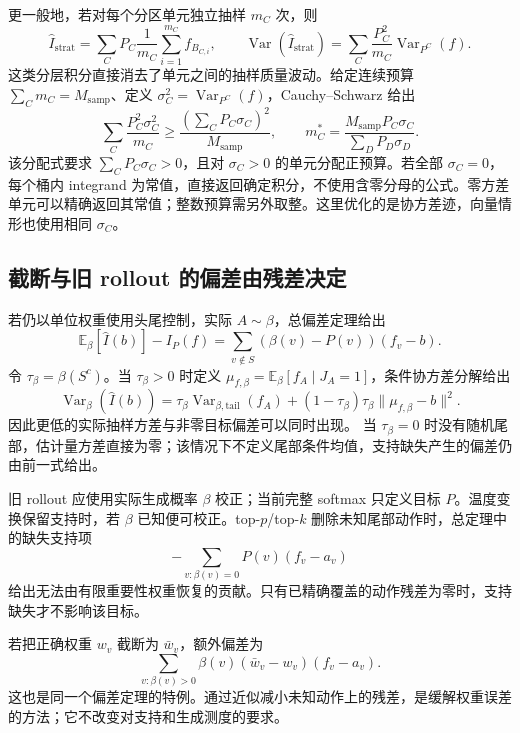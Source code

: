 \documentclass[lang=cn,scheme=chinese,openany]{../book/elegantbook}
\newcommand{\E}{\mathbb E}
\newcommand{\Var}{\operatorname{Var}}
\newcommand{\tail}{\mathrm{tail}}
\begin{document}
更一般地，若对每个分区单元独立抽样 $m_C$ 次，则
\begin{equation*}
 \widehat I_{\mathrm{strat}}
 =\sum_CP_C\frac1{m_C}\sum_{i=1}^{m_C}f_{B_{C,i}},\qquad
 \Var(\widehat I_{\mathrm{strat}})
 =\sum_C\frac{P_C^2}{m_C}\Var_{P^C}(f).
\end{equation*}
这类分层积分直接消去了单元之间的抽样质量波动。给定连续预算 $\sum_Cm_C=M_{\mathrm{samp}}$、定义 $\sigma_C^2=\Var_{P^C}(f)$，Cauchy--Schwarz 给出
\begin{equation*}
 \sum_C\frac{P_C^2\sigma_C^2}{m_C}
 \ge\frac{(\sum_CP_C\sigma_C)^2}{M_{\mathrm{samp}}},
 \qquad m_C^*=\frac{M_{\mathrm{samp}}P_C\sigma_C}{\sum_DP_D\sigma_D}.
\end{equation*}
该分配式要求 $\sum_CP_C\sigma_C>0$，且对 $\sigma_C>0$ 的单元分配正预算。若全部 $\sigma_C=0$，每个桶内 integrand 为常值，直接返回确定积分，不使用含零分母的公式。零方差单元可以精确返回其常值；整数预算需另外取整。这里优化的是协方差迹，向量情形也使用相同 $\sigma_C$。

\subsection{截断与旧 rollout 的偏差由残差决定}
若仍以单位权重使用头尾控制，实际 $A\sim\beta$，总偏差定理给出
\begin{equation}\label{est:eq:kl-wrong-measure-bias}
 \E_\beta[\widehat I(b)]-I_P(f)
 =\sum_{v\notin S}(\beta(v)-P(v))(f_v-b).
\end{equation}
令 $\tau_\beta=\beta(S^c)$。当 $\tau_\beta>0$ 时定义 $\mu_{f,\beta}=\E_\beta[f_A\mid J_A=1]$，条件协方差分解给出
\begin{equation}\label{est:eq:kl-wrong-measure-var}
 \Var_\beta(\widehat I(b))
 =\tau_\beta\Var_{\beta,\tail}(f_A)
 +(1-\tau_\beta)\tau_\beta\|\mu_{f,\beta}-b\|^2.
\end{equation}
因此更低的实际抽样方差与非零目标偏差可以同时出现。
当 $\tau_\beta=0$ 时没有随机尾部，估计量方差直接为零；该情况下不定义尾部条件均值，支持缺失产生的偏差仍由前一式给出。

旧 rollout 应使用实际生成概率 $\beta$ 校正；当前完整 softmax 只定义目标 $P$。温度变换保留支持时，若 $\beta$ 已知便可校正。top-$p$/top-$k$ 删除未知尾部动作时，总定理中的缺失支持项
\begin{equation*}
 -\sum_{v:\beta(v)=0}P(v)(f_v-a_v)
\end{equation*}
给出无法由有限重要性权重恢复的贡献。只有已精确覆盖的动作残差为零时，支持缺失才不影响该目标。

若把正确权重 $w_v$ 截断为 $\bar w_v$，额外偏差为
\begin{equation*}
 \sum_{v:\beta(v)>0}\beta(v)(\bar w_v-w_v)(f_v-a_v).
\end{equation*}
这也是同一个偏差定理的特例。通过近似减小未知动作上的残差，是缓解权重误差的方法；它不改变对支持和生成测度的要求。
\end{document}

